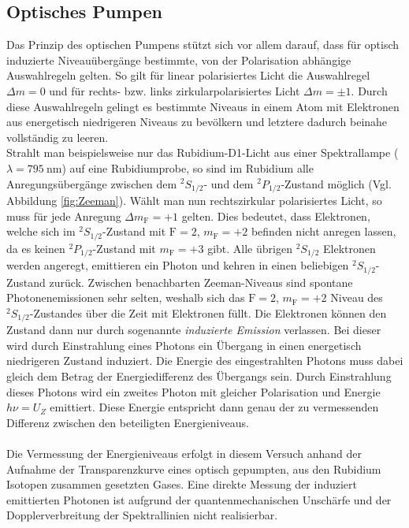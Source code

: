 \subsection{Optisches Pumpen}
Das Prinzip des optischen Pumpens stützt sich vor allem darauf, dass für optisch induzierte Niveauübergänge bestimmte, von der Polarisation abhängige Auswahlregeln gelten. So gilt für linear polarisiertes Licht die Auswahlregel $\Delta m = 0$ und für rechts- bzw. links zirkularpolarisiertes Licht $\Delta m = \pm 1$. Durch diese Auswahlregeln gelingt es bestimmte Niveaus in einem Atom mit Elektronen aus energetisch niedrigeren Niveaus zu bevölkern und letztere dadurch beinahe vollständig zu leeren.\\
Strahlt man beispielsweise nur das Rubidium-D1-Licht aus einer Spektrallampe ($\lambda=\SI{795}{\nano\meter}$) auf eine Rubidiumprobe, so sind im Rubidium alle Anregungsübergänge zwischen dem $^2{S}_{1/2}$- und dem $^2{P}_{1/2}$-Zustand möglich (Vgl. Abbildung \ref{fig:Zeeman}). Wählt man nun rechtszirkular polarisiertes Licht, so muss für jede Anregung $\Delta m_{\text{F}}=+1$ gelten. Dies bedeutet, dass Elektronen, welche sich im $^2{S}_{1/2}$-Zustand mit $\text{F}=2$, $m_{\text{F}}= +2$ befinden nicht anregen lassen, da es keinen $^2{P}_{1/2}$-Zustand mit $m_{\text{F}}=+3$ gibt. Alle übrigen $^2{S}_{1/2}$
Elektronen werden angeregt, emittieren ein Photon und kehren in einen beliebigen $^2{S}_{1/2}$-Zustand zurück. Zwischen benachbarten Zeeman-Niveaus sind spontane Photonenemissionen sehr selten, weshalb sich das $\text{F}=2$, $m_{\text{F}}=+2$ Niveau des $^2{ S}_{1/2}$-Zustandes über die Zeit mit Elektronen füllt.
Die Elektronen können den Zustand dann nur durch sogenannte \textit{induzierte Emission} verlassen. Bei dieser wird durch Einstrahlung eines Photons ein Übergang in einen energetisch niedrigeren Zustand induziert. Die Energie des eingestrahlten Photons muss dabei gleich dem Betrag der Energiedifferenz des Übergangs sein. Durch Einstrahlung dieses Photons wird ein zweites Photon mit gleicher Polarisation und Energie $h\nu = U_{Z}$ emittiert. Diese Energie entspricht dann genau der zu vermessenden Differenz zwischen den beteiligten Energieniveaus.\\
\\
Die Vermessung der Energieniveaus erfolgt in diesem Versuch anhand der Aufnahme der Transparenzkurve eines optisch gepumpten, aus den Rubidium Isotopen zusammen gesetzten Gases. Eine direkte Messung der induziert emittierten Photonen ist aufgrund der quantenmechanischen Unschärfe und der Dopplerverbreitung der Spektrallinien nicht realisierbar.
